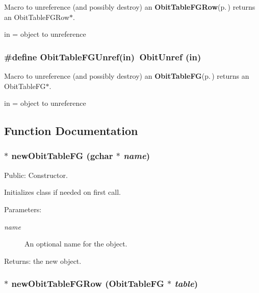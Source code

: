 Macro to unreference (and possibly destroy) an {\bf Obit\-Table\-FGRow}{\rm (p.\,\pageref{structObitTableFGRow})} returns an Obit\-Table\-FGRow$\ast$. 

in = object to unreference 
\subsubsection{\setlength{\rightskip}{0pt plus 5cm}\#define Obit\-Table\-FGUnref(in)\ Obit\-Unref (in)}\label{ObitTableFG_8h_a1}


Macro to unreference (and possibly destroy) an {\bf Obit\-Table\-FG}{\rm (p.\,\pageref{structObitTableFG})} returns an Obit\-Table\-FG$\ast$. 

in = object to unreference 

\subsection{Function Documentation}
\subsubsection{$\ast$ new\-Obit\-Table\-FG (gchar $\ast$ {\em name})}\label{ObitTableFG_8h_a11}


Public: Constructor. 

Initializes class if needed on first call. \begin{Desc}
\item[Parameters:]
\begin{description}
\item[{\em name}]An optional name for the object. \end{description}
\end{Desc}
\begin{Desc}
\item[Returns:]the new object. \end{Desc}
\subsubsection{$\ast$ new\-Obit\-Table\-FGRow ({\bf Obit\-Table\-FG} $\ast$ {\em table})}\label{ObitTableFG_8h_a8}


